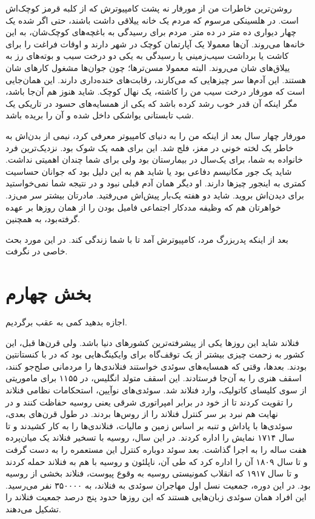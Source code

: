 روشن‌ترین خاطرات من از مورفار نه پشت کامپیوترش که از کلبه قرمز کوچک‌اش
است. در هلسینکی مرسوم که مردم یک خانه ییلاقی داشت باشند، حتی اگر شده
یک چهار دیواری ده متر در ده متر. مردم برای رسیدگی به باغچه‌های کوچک‌شان،
به این خانه‌ها می‌روند. آن‌ها معمولا یک آپارتمان کوچک در شهر دارند و
اوقات فراغت را برای کاشت یا برداشت سیب‌زمینی یا رسیدگی به یکی دو درخت
سیب و بوته‌های رز به ییلاق‌های شان می‌روند. البته معمولا مسن‌ترها؛ چون
جوان‌ها مشغول کارهای شان هستند. این آدم‌ها سر چیزهایی که می‌کارند،
رقابت‌های خنده‌داری دارند. این همان‌جایی است که مورفار درخت سیب من را
کاشته، یک نهال کوچک. شاید هنوز هم آن‌جا باشد، مگر اینکه آن قدر خوب رشد
کرده باشد که یکی از همسایه‌های حسود در تاریکی یک شب تابستانی یواشکی
داخل شده و آن را بریده باشد.

مورفار چهار سال بعد از اینکه من را به دنیای کامپیوتر معرفی کرد، نیمی
از بدن‌اش به خاطر یک لخته خونی در مغز، فلج شد. این برای همه یک شوک
بود. نزدیک‌ترین فرد خانواده به شما، برای یک‌سال در بیمارستان بود ولی
برای شما چندان اهمیتی نداشت. شاید یک جور مکانیسم دفاعی بود یا شاید هم
به این دلیل بود که جوانان حساسیت کمتری به اینجور چیزها دارند. او دیگر
همان آدم قبلی نبود و در نتیجه شما نمی‌خواستید برای دیدن‌اش بروید. شاید
دو هفته یک‌بار پیش‌اش می‌رفتید. مادرتان بیشتر سر می‌زد. خواهرتان هم که
وظیفه مددکار اجتماعی فامیل بودن را از همان روزها بر عهده گرفته‌بود، به
همچنین.

بعد از اینکه پدربزرگ مرد، کامپیوترش آمد تا با شما زندگی کند. در این
مورد بحث خاصی در نگرفت.

\section{بخش چهارم}
اجازه بدهید کمی به عقب برگردیم.

فنلاند شاید این روزها یکی از پیشرفته‌ترین کشورهای دنیا باشد. ولی قرن‌ها
قبل، این کشور به زحمت چیزی بیشتر از یک توقف‌گاه برای وایکینگ‌هایی بود که
در  با کنستانتین بودند. بعدها، وقتی که همسایه‌های سوئدی
خواستند فنلاندی‌ها را مردمانی صلح‌جو کنند، اسقف هنری را به آن‌جا
فرستادند. این اسقف متولد انگلیس، در ۱۱۵۵ برای ماموریتی از سوی کلیسای
کاتولیک، وارد فنلاند شد. سوئدی‌های نوآیین، استحکامات نظامی فنلاند را
تقویت کردند تا از خود در برابر امپراتوری شرقی یعنی روسیه حفاظت کنند و
در نهایت هم نبرد بر سر کنترل فنلاند را از روس‌ها بردند. در طول قرن‌های
بعدی، سوئدی‌ها با پاداش‌ و تنبه بر اساس زمین و مالیات، فنلاندی‌ها را به
کار کشیدند و تا سال ۱۷۱۴ نمایش را اداره کردند. در این سال، روسیه با
تسخیر فنلاند یک میان‌پرده هفت ساله را به اجرا گذاشت. بعد سوئد دوباره
کنترل این مستعمره را به دست گرفت و تا سال ۱۸۰۹ آن را اداره کرد که طی
آن، ناپلئون و روسیه با هم به فنلاند حمله کردند و تا سال ۱۹۱۷ که انقلاب
کمونیستی روسیه به وقوع پیوست، فنلاند بخشی از روسیه بود. در این دوره،
جمعیت نسل اول مهاجران سوئدی به فنلاند، به ۳۵۰۰۰۰ نفر می‌رسید. این افراد
همان‌ سوئدی زبان‌هایی هستند که این روزها حدود پنج درصد جمعیت فنلاند را
تشکیل می‌دهند.

